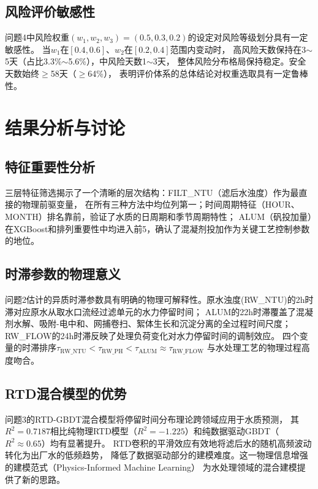 \documentclass[12pt,a4paper]{ctexart}
\begin{document}
\subsection{风险评价敏感性}

问题4中风险权重$(w_1, w_2, w_3) = (0.5, 0.3, 0.2)$的设定对风险等级划分具有一定敏感性。
当$w_1$在$[0.4, 0.6]$、$w_2$在$[0.2, 0.4]$范围内变动时，
高风险天数保持在3$\sim$5天（占比3.3\%$\sim$5.6\%），中风险天数1$\sim$3天，
整体风险分布格局保持稳定。安全天数始终$\geq$58天（$\geq$64\%），
表明评价体系的总体结论对权重选取具有一定鲁棒性。

\section{结果分析与讨论}

\subsection{特征重要性分析}

三层特征筛选揭示了一个清晰的层次结构：FILT\_NTU（滤后水浊度）作为最直接的物理前驱变量，
在所有三种方法中均位列第一；时间周期特征（HOUR、MONTH）排名靠前，验证了水质的日周期和季节周期特性；
ALUM（矾投加量）在XGBoost和排列重要性中均进入前5，确认了混凝剂投加作为关键工艺控制参数的地位。

\subsection{时滞参数的物理意义}

问题2估计的异质时滞参数具有明确的物理可解释性。原水浊度(RW\_NTU)的2h时滞对应原水从取水口流经过滤单元的水力停留时间；
ALUM的22h时滞覆盖了混凝剂水解、吸附-电中和、网捕卷扫、絮体生长和沉淀分离的全过程时间尺度；
RW\_FLOW的24h时滞反映了处理负荷变化对水力停留时间的调制效应。
四个变量的时滞排序$\tau_{\mathrm{RW\_NTU}} < \tau_{\mathrm{RW\_PH}} < \tau_{\mathrm{ALUM}} \approx \tau_{\mathrm{RW\_FLOW}}$
与水处理工艺的物理过程高度吻合。

\subsection{RTD混合模型的优势}

问题3的RTD-GBDT混合模型将停留时间分布理论跨领域应用于水质预测，
其$R^2=0.7187$相比纯物理RTD模型（$R^2=-1.225$）和纯数据驱动GBDT（$R^2\approx0.65$）均有显著提升。
RTD卷积的平滑效应有效地将滤后水的随机高频波动转化为出厂水的低频趋势，
降低了数据驱动部分的建模难度。这一物理信息增强的建模范式（Physics-Informed Machine Learning）
为水处理领域的混合建模提供了新的思路\cite{ref9}。
\end{document}
